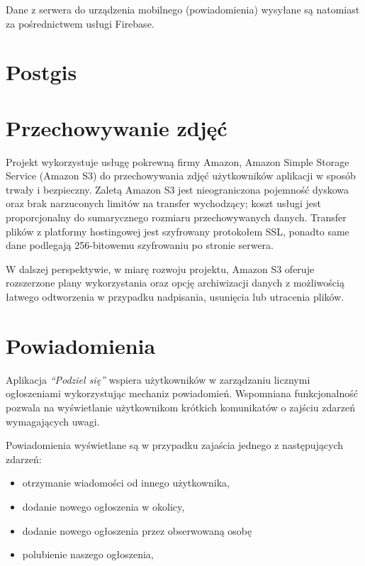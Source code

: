 \documentclass[licencjacka]{pracamgr}
\begin{document}
Dane z serwera do urządzenia mobilnego (powiadomienia) wysyłane są natomiast za pośrednictwem usługi Firebase.

\section{Postgis}

\section{Przechowywanie zdjęć} 

Projekt wykorzystuje usługę pokrewną firmy Amazon, Amazon Simple Storage Service (Amazon S3) do przechowywania zdjęć użytkowników aplikacji w sposób trwały i bezpieczny. Zaletą Amazon S3 jest nieograniczona pojemność dyskowa oraz brak narzuconych limitów na transfer wychodzący; koszt usługi jest proporcjonalny do sumarycznego rozmiaru przechowywanych danych. Transfer plików z platformy hostingowej jest szyfrowany protokołem SSL, ponadto same dane podlegają 256-bitowemu szyfrowaniu po stronie serwera.

W dalszej perspektywie, w miarę rozwoju projektu, Amazon S3 oferuje rozszerzone plany wykorzystania oraz opcję archiwizacji danych z możliwością łatwego odtworzenia w przypadku nadpisania, usunięcia lub utracenia plików.

\section{Powiadomienia}

Aplikacja \textit{``Podziel się''} wspiera użytkowników w zarządzaniu licznymi ogłoszeniami wykorzystując mechaniz powiadomień. Wspomniana funkcjonalność pozwala na wyświetlanie użytkownikom krótkich komunikatów o zajściu zdarzeń wymagających uwagi.

Powiadomienia wyświetlane są w przypadku zajaścia jednego z następujących zdarzeń:
\begin{itemize}
\setlength\itemsep{-0.2em}
    \item otrzymanie wiadomości od innego użytkownika,
    \item dodanie nowego ogłoszenia w okolicy,
    \item dodanie nowego ogłoszenia przez obserwowaną osobę
    \item polubienie naszego ogłoszenia,
\end{itemize}{}
\end{document}
